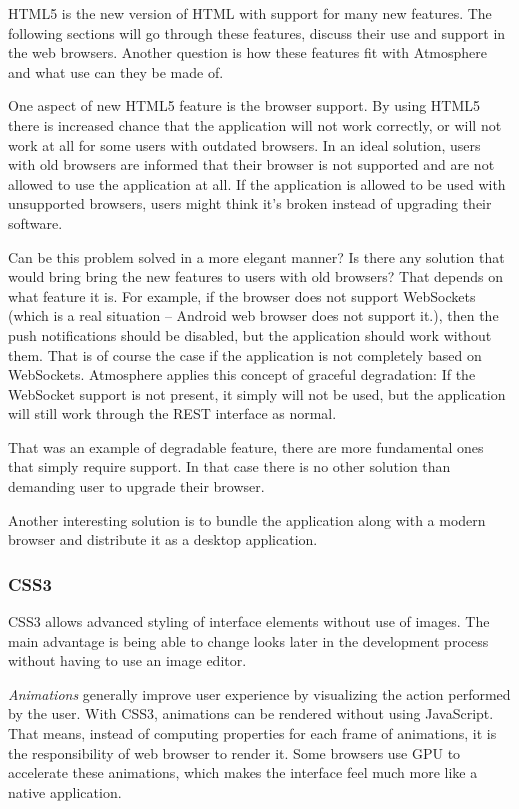 HTML5 is the new version of HTML with support for many new features. The following sections will go through these features, discuss their use and support in the web browsers. Another question is how these features fit with Atmosphere and what use can they be made of.

One aspect of new HTML5 feature is the browser support. By using HTML5 there is increased chance that the application will not work correctly, or will not work at all for some users with outdated browsers. In an ideal solution, users with old browsers are informed that their browser is not supported and are not allowed to use the application at all. If the application is allowed to be used with unsupported browsers, users might think it's broken instead of upgrading their software.

Can be this problem solved in a more elegant manner? Is there any solution that would bring bring the new features to users with old browsers? That depends on what feature it is. For example, if the browser does not support WebSockets (which is a real situation – Android web browser does not support it.), then the push notifications should be disabled, but the application should work without them. That is of course the case if the application is not completely based on WebSockets. Atmosphere applies this concept of graceful degradation: If the WebSocket support is not present, it simply will not be used, but the application will still work through the REST interface as normal. \citep{javascript_bible_book}

That was an example of degradable feature, there are more fundamental ones that simply require support. In that case there is no other solution than demanding user to upgrade their browser.

Another interesting solution is to bundle the application along with a modern browser and distribute it as a desktop application.

\subsubsection{CSS3}

CSS3 allows advanced styling of interface elements without use of images. The main advantage is being able to change looks later in the development process without having to use an image editor. \citep{css3_book}

\emph{Animations} generally improve user experience by visualizing the action performed by the user. With CSS3, animations can be rendered without using JavaScript. That means, instead of computing properties for each frame of animations, it is the responsibility of web browser to render it. Some browsers use GPU to accelerate these animations, which makes the interface feel much more like a native application.

